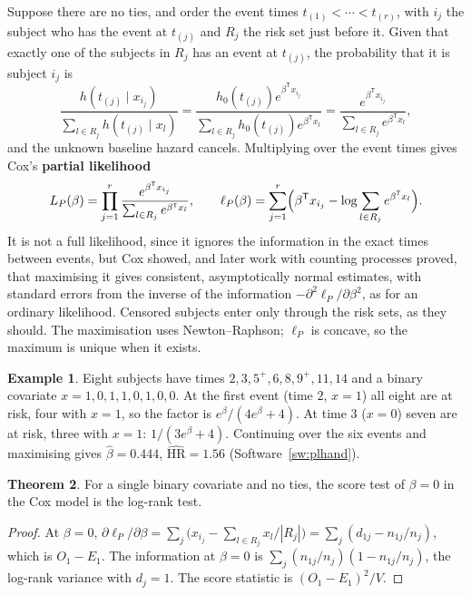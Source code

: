 \documentclass[11pt,a4paper]{article}
\numberwithin{equation}{section}
\theoremstyle{definition}
\newtheorem{thm}{Theorem}[subsection]
\newtheorem{exa}[thm]{Example}
\begin{document}
Suppose there are no ties, and order the event times $t_{(1)} < \cdots < t_{(r)}$, with $i_j$ the subject who has the event at $t_{(j)}$ and $R_j$ the risk set just before it. Given that exactly one of the subjects in $R_j$ has an event at $t_{(j)}$, the probability that it is subject $i_j$ is
\[
\frac{h(t_{(j)} \mid x_{i_j})}{\sum_{l \in R_j}h(t_{(j)} \mid x_l)} = \frac{h_0(t_{(j)})e^{\beta^{\mathsf T}x_{i_j}}}{\sum_{l \in R_j}h_0(t_{(j)})e^{\beta^{\mathsf T}x_l}} = \frac{e^{\beta^{\mathsf T}x_{i_j}}}{\sum_{l \in R_j}e^{\beta^{\mathsf T}x_l}} ,
\]
and the unknown baseline hazard cancels. Multiplying over the event times gives Cox's \textbf{partial likelihood}
\[
L_P(\beta) = \prod_{j = 1}^r\frac{e^{\beta^{\mathsf T}x_{i_j}}}{\sum_{l \in R_j}e^{\beta^{\mathsf T}x_l}}, \qquad \ell_P(\beta) = \sum_{j = 1}^r\Bigl(\beta^{\mathsf T}x_{i_j} - \log\sum_{l \in R_j}e^{\beta^{\mathsf T}x_l}\Bigr) .
\]
It is not a full likelihood, since it ignores the information in the exact times between events, but Cox showed, and later work with counting processes proved, that maximising it gives consistent, asymptotically normal estimates, with standard errors from the inverse of the information $-\partial^2\ell_P/\partial\beta^2$, as for an ordinary likelihood.
Censored subjects enter only through the risk sets, as they should. The maximisation uses Newton--Raphson; $\ell_P$ is concave, so the maximum is unique when it exists.

\begin{exa}
\label{ex:pl}
Eight subjects have times $2, 3, 5^+, 6, 8, 9^+, 11, 14$ and a binary covariate $x = 1, 0, 1, 1, 0, 1, 0, 0$. At the first event (time $2$, $x = 1$) all eight are at risk, four with $x = 1$, so the factor is $e^\beta/(4e^\beta + 4)$. At time $3$ ($x = 0$) seven are at risk, three with $x = 1$: $1/(3e^\beta + 4)$. Continuing over the six events and maximising gives
$\hat\beta = 0.444$, $\widehat{\text{HR}} = 1.56$ (Software~\ref{sw:plhand}).
\end{exa}

\begin{thm}
\label{thm:scorelogrank}
For a single binary covariate and no ties, the score test of $\beta = 0$ in the Cox model is the log-rank test.
\end{thm}

\begin{proof}
At $\beta = 0$, $\partial\ell_P/\partial\beta = \sum_j\bigl(x_{i_j} - \sum_{l \in R_j}x_l/|R_j|\bigr) = \sum_j(d_{1j} - n_{1j}/n_j)$, which is $O_1 - E_1$. The information at $\beta = 0$ is $\sum_j(n_{1j}/n_j)(1 - n_{1j}/n_j)$, the log-rank variance with $d_j = 1$. The score statistic is $(O_1 - E_1)^2/V$.
\end{proof}
\end{document}
